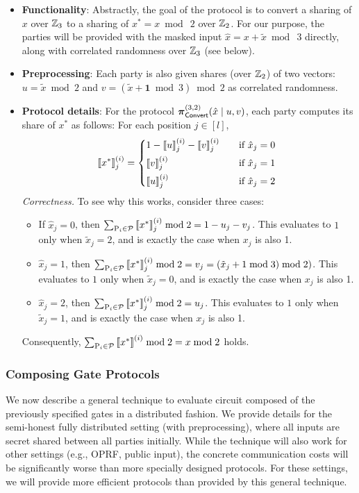\begin{itemize}
  \item \textbf{Functionality}: Abstractly, the goal of the protocol is to convert a sharing of $x$ over $\mathbb{Z}_3$ to a sharing of $x^* = x \bmod~2$ over $\mathbb{Z}_2$. For our purpose, the parties will be provided with the masked input $\hat{x} = x + \tilde{x} \bmod~3$ directly, along with correlated randomness over $\mathbb{Z}_3$ (see below).

  \item \textbf{Preprocessing}: Each party is also given shares (over $\mathbb{Z}_2$) of two vectors: $u = \tilde{x} \bmod 2$ and $v = (\tilde{x} + \textbf{1} \bmod 3) \bmod 2$ as correlated randomness.


  \item \textbf{Protocol details}: For the protocol $\boldsymbol{\pi}_{\textsf{Convert}}^{(3,2)}(\hat{x} \mid u, v)$, each party computes its share of $x^*$ as follows: For each position $j \in [l]$,
\[
\sharei{x^*}_j = 
\begin{cases*}
       1 - \sharei{u}_j - \sharei{v}_j  & \quad if $\hat{x}_j = 0$ \\
       \sharei{v}_j & \quad if $\hat{x}_j = 1$ \\
       \sharei{u}_j & \quad if $\hat{x}_j = 2$
\end{cases*}
\]
\textit{Correctness.} To see why this works, consider three cases:
\begin{itemize}
\item If $\hat{x}_j = 0$, then $\sum_{\textnormal{P}_i \in \mathcal{P}} \left\llbracket x^* \right\rrbracket^{(i)}_j \bmod 2 = 1 - u_j - v_j$. This evaluates to $1$ only when $\tilde{x}_j = 2$, and is exactly the case when $x_j$ is also 1.

\item $\hat{x}_j = 1$, then $\sum_{\textnormal{P}_i \in \mathcal{P}} \left\llbracket x^* \right\rrbracket^{(i)}_j \bmod 2 = v_j = (\tilde{x}_j + 1 \bmod 3) \bmod 2)$. This evaluates to $1$ only when $\tilde{x}_j = 0$, and is exactly the case when $x_j$ is also 1.

\item $\hat{x}_j = 2$, then $\sum_{\textnormal{P}_i \in \mathcal{P}} \left\llbracket x^* \right\rrbracket^{(i)}_j \bmod 2 = u_j$. This evaluates to $1$ only when $\tilde{x}_j = 1$, and is exactly the case when $x_j$ is also 1.
\end{itemize}
Consequently, $\sum_{\textnormal{P}_i \in \mathcal{P}} \left\llbracket x^* \right\rrbracket^{(i)} \bmod 2 = x \bmod 2$ holds.
\end{itemize}


\subsubsection{Composing Gate Protocols}
We now describe a general technique to evaluate circuit composed of the previously specified gates in a distributed fashion. We provide details for the semi-honest fully distributed setting (with preprocessing), where all inputs are secret shared between all parties initially. While the technique will also work for other settings (e.g., OPRF, public input), the concrete communication costs will be significantly worse than more specially designed protocols. For these settings, we will provide more efficient protocols than provided by this general technique.

